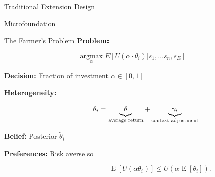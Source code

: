 \documentclass[
  ignorenonframetext,
]{beamer}
\begin{document}
\begin{frame}{Traditional Extension Design}
\begin{figure}
\begin{minipage}[t]{0.20\linewidth}
{\centering 


}

\end{minipage}%

\end{figure}
\end{frame}

\begin{frame}{Microfoundation}
\protect\hypertarget{microfoundation}{}
\end{frame}

\begin{frame}{The Farmer's Problem}
\protect\hypertarget{the-farmers-problem}{}
\textbf{Problem:}

\[ 
\operatorname*{argmax}_\alpha E[U(\alpha \cdot \theta_i ) | s_1, \ldots s_n, s_E]
\]

\textbf{Decision:} Fraction of investment \(\alpha \in [0, 1]\)

\textbf{Heterogeneity:}

\[
\ \ \ \ \ \ \ \ \ \ \ \ \theta_i = \underbrace{\theta \vphantom{\gamma_i}  }_{\text{average return}} + \underbrace{\gamma_i}_{\text{context adjustment}}
\]

\textbf{Belief:} Posterior \(\tilde{\theta}_i\)

\textbf{Preferences:} Risk averse so

\[
\ \ \ \ \ \ \ \ \ \ \ \ \ \ \ \ \ \ \ \ \ \ \ \ \ \ \ \ \ \ \ \ \ \ \ \  \operatorname{E}[U(\alpha \theta_i)] \leq U(\alpha  \operatorname{E}[\theta_i]).
\]
\end{frame}
\end{document}
